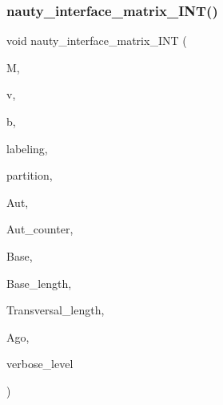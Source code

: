 \subsubsection{\texorpdfstring{nauty\+\_\+interface\+\_\+matrix\+\_\+\+I\+N\+T()}{nauty\_interface\_matrix\_INT()}}
{\footnotesize\ttfamily void nauty\+\_\+interface\+\_\+matrix\+\_\+\+I\+NT (\begin{DoxyParamCaption}\item[{\mbox{\hyperlink{galois_8h_a09fddde158a3a20bd2dcadb609de11dc}{I\+NT}} $\ast$}]{M,  }\item[{\mbox{\hyperlink{galois_8h_a09fddde158a3a20bd2dcadb609de11dc}{I\+NT}}}]{v,  }\item[{\mbox{\hyperlink{galois_8h_a09fddde158a3a20bd2dcadb609de11dc}{I\+NT}}}]{b,  }\item[{\mbox{\hyperlink{galois_8h_a09fddde158a3a20bd2dcadb609de11dc}{I\+NT}} $\ast$}]{labeling,  }\item[{\mbox{\hyperlink{galois_8h_a09fddde158a3a20bd2dcadb609de11dc}{I\+NT}} $\ast$}]{partition,  }\item[{\mbox{\hyperlink{galois_8h_a09fddde158a3a20bd2dcadb609de11dc}{I\+NT}} $\ast$}]{Aut,  }\item[{\mbox{\hyperlink{galois_8h_a09fddde158a3a20bd2dcadb609de11dc}{I\+NT}} \&}]{Aut\+\_\+counter,  }\item[{\mbox{\hyperlink{galois_8h_a09fddde158a3a20bd2dcadb609de11dc}{I\+NT}} $\ast$}]{Base,  }\item[{\mbox{\hyperlink{galois_8h_a09fddde158a3a20bd2dcadb609de11dc}{I\+NT}} \&}]{Base\+\_\+length,  }\item[{\mbox{\hyperlink{galois_8h_a09fddde158a3a20bd2dcadb609de11dc}{I\+NT}} $\ast$}]{Transversal\+\_\+length,  }\item[{\mbox{\hyperlink{galois_8h_a09fddde158a3a20bd2dcadb609de11dc}{I\+NT}} \&}]{Ago,  }\item[{\mbox{\hyperlink{galois_8h_a09fddde158a3a20bd2dcadb609de11dc}{I\+NT}}}]{verbose\+\_\+level }\end{DoxyParamCaption})}

